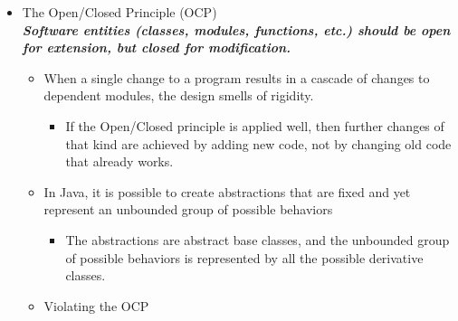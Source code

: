 \begin{itemize}
	\item The Open/Closed Principle (OCP)\\
	\textbf{\emph{Software entities (classes, modules, functions, etc.) should be open for extension, but closed for modification.}}
	\begin{itemize}
		\item When a single change to a program results in a cascade of changes to dependent modules, the design smells of rigidity.
		\begin{itemize}
			\item If the Open/Closed principle is applied well, then further changes of that kind are achieved by adding new code, not by changing old code that already works.
		\end{itemize}
		\item In Java, it is possible to create abstractions that are fixed and yet represent an unbounded group of possible behaviors
		\begin{itemize}
			\item The abstractions are abstract base classes, and the unbounded group of possible behaviors is represented by all the possible derivative classes.
		\end{itemize}
		\item Violating the OCP
		\vspace{\itemsep}
		\vspace{\parsep}


\end{itemize}
\end{itemize}
